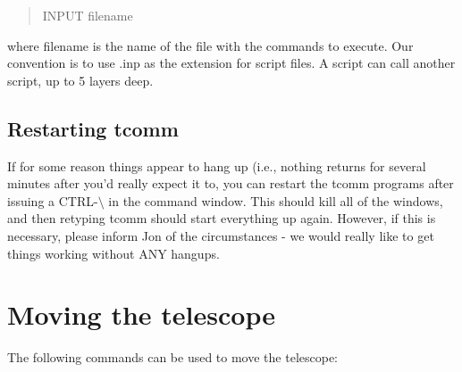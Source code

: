 \documentclass[10pt]{report}
\renewcommand{\[}{\begin{eqnarray}}
\renewcommand{\]}{\end{eqnarray}}
\begin{document}
\begin{quote}
INPUT filename
\end{quote}

where filename is the name of the file with the commands to execute. Our 
convention is to use .inp as the extension for script files.
A script can call another script, up to 5 layers deep. 

\subsection{Restarting tcomm}
If for some reason
things appear to hang up (i.e., nothing returns for several minutes after
you'd really expect it to, you can restart the tcomm programs after issuing
a CTRL-$\setminus$ in the command window. This should kill all of the windows, and
then retyping tcomm should start everything up again. However, if this is
necessary, please inform Jon of the circumstances - we would really like to
get things working without ANY hangups.

\section{Moving the telescope} 

The following commands can be used to move the telescope:
\end{document}
